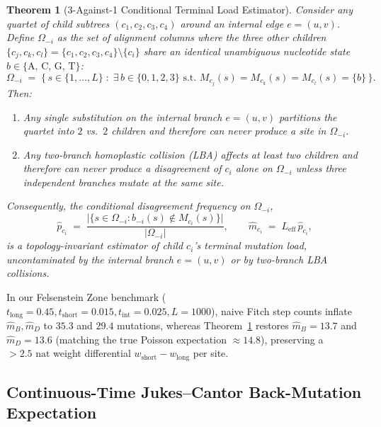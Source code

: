 \documentclass[11pt,a4paper]{article}
\newtheorem{theorem}{Theorem}
\begin{document}
\begin{theorem}[3-Against-1 Conditional Terminal Load Estimator]
\label{thm:three_against_one}
Consider any quartet of child subtrees $(c_1, c_2, c_3, c_4)$ around an internal edge $e = (u,v)$. Define $\Omega_{-i}$ as the set of alignment columns where the three other children $\{c_j, c_k, c_l\} = \{c_1, c_2, c_3, c_4\} \setminus \{c_i\}$ share an identical unambiguous nucleotide state $b \in \{\text{A, C, G, T}\}$:
\begin{equation}
    \Omega_{-i} \;=\; \big\{\, s \in \{1,\dots,L\} \;:\; \exists\, b \in \{0,1,2,3\} \text{ s.t. } M_{c_j}(s) = M_{c_k}(s) = M_{c_l}(s) = \{b\} \,\big\}.
\end{equation}
Then:
\begin{enumerate}[leftmargin=1.8em]
    \item Any single substitution on the internal branch $e = (u,v)$ partitions the quartet into $2$ vs.\ $2$ children and therefore can \emph{never} produce a site in $\Omega_{-i}$.
    \item Any two-branch homoplastic collision (LBA) affects at least two children and therefore can \emph{never} produce a disagreement of $c_i$ alone on $\Omega_{-i}$ unless three independent branches mutate at the same site.
\end{enumerate}
Consequently, the conditional disagreement frequency on $\Omega_{-i}$,
\begin{equation}
    \hat{p}_{c_i} \;=\; \frac{\big|\{s \in \Omega_{-i} : b_{-i}(s) \notin M_{c_i}(s)\}\big|}{|\Omega_{-i}|}, \qquad \hat{m}_{c_i} \;=\; L_{\text{eff}}\,\hat{p}_{c_i},
    \label{eq:three_against_one}
\end{equation}
is a topology-invariant estimator of child $c_i$'s terminal mutation load, uncontaminated by the internal branch $e=(u,v)$ or by two-branch LBA collisions.
\end{theorem}

In our Felsenstein Zone benchmark ($t_{\text{long}}=0.45, t_{\text{short}}=0.015, t_{\text{int}}=0.025, L=1000$), naive Fitch step counts inflate $\hat{m}_B, \hat{m}_D$ to $35.3$ and $29.4$ mutations, whereas Theorem~\ref{thm:three_against_one} restores $\hat{m}_B = 13.7$ and $\hat{m}_D = 13.6$ (matching the true Poisson expectation $\approx 14.8$), preserving a $>2.5\text{ nat}$ weight differential $w_{\text{short}} - w_{\text{long}}$ per site.

\subsection{Continuous-Time Jukes--Cantor Back-Mutation Expectation}
\end{document}
